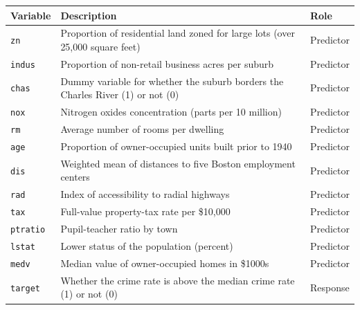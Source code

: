 \documentclass[
  11pt]{article}
\begin{document}
\begin{longtable}[]{@{}
  >{\raggedright\arraybackslash}p{}
  >{\raggedright\arraybackslash}p{}
  >{\raggedright\arraybackslash}p{}@{}}
\toprule\noalign{}
\begin{minipage}[b]{\linewidth}\raggedright
Variable
\end{minipage} & \begin{minipage}[b]{\linewidth}\raggedright
Description
\end{minipage} & \begin{minipage}[b]{\linewidth}\raggedright
Role
\end{minipage} \\
\midrule\noalign{}
\endhead
\bottomrule\noalign{}
\endlastfoot
\texttt{zn} & Proportion of residential land zoned for large lots (over
25,000 square feet) & Predictor \\
\texttt{indus} & Proportion of non-retail business acres per suburb &
Predictor \\
\texttt{chas} & Dummy variable for whether the suburb borders the
Charles River (1) or not (0) & Predictor \\
\texttt{nox} & Nitrogen oxides concentration (parts per 10 million) &
Predictor \\
\texttt{rm} & Average number of rooms per dwelling & Predictor \\
\texttt{age} & Proportion of owner-occupied units built prior to 1940 &
Predictor \\
\texttt{dis} & Weighted mean of distances to five Boston employment
centers & Predictor \\
\texttt{rad} & Index of accessibility to radial highways & Predictor \\
\texttt{tax} & Full-value property-tax rate per \$10,000 & Predictor \\
\texttt{ptratio} & Pupil-teacher ratio by town & Predictor \\
\texttt{lstat} & Lower status of the population (percent) & Predictor \\
\texttt{medv} & Median value of owner-occupied homes in \$1000s &
Predictor \\
\texttt{target} & Whether the crime rate is above the median crime rate
(1) or not (0) & Response \\
\end{longtable}
\end{document}

